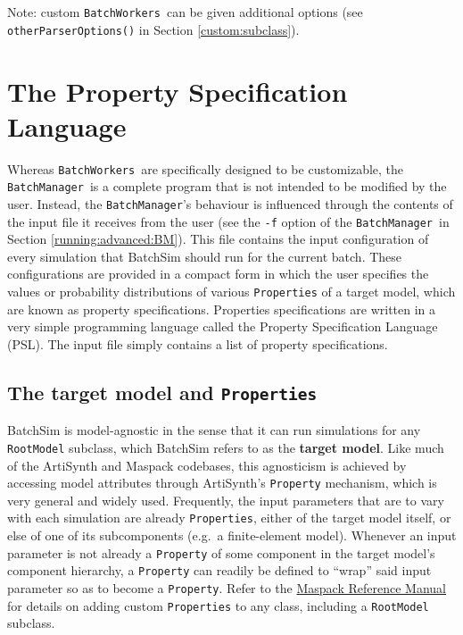 \documentclass{article}
\newcommand{\BM}{{\tt BatchManager}}
\newcommand{\BWs}{{\tt BatchWorkers}}
\begin{document}
\begin{sideblock}
Note: custom \BWs\ can be given additional options (see {\tt otherParserOptions()} in Section \ref{custom:subclass}).
\end{sideblock}

\section{The Property Specification Language}
\label{psl}

Whereas \BWs\ are specifically designed to be customizable, the \BM\ is a complete program that is not intended to be modified by the user. Instead, the \BM's behaviour is influenced through the contents of the input file it receives from the user (see the {\tt -f} option of the \BM\ in Section \ref{running:advanced:BM}). This file contains the input configuration of every simulation that BatchSim should run for the current batch. These configurations are provided in a compact form in which the user specifies the values or probability distributions of various {\tt Properties} of a target model, which are known as property specifications. Properties specifications are written in a very simple programming language called the Property Specification Language (PSL). The input file simply contains a list of property specifications.

\subsection{The target model and {\tt Properties}}
\label{psl:target-model}

BatchSim is model-agnostic in the sense that it can run simulations for any {\tt RootModel} subclass, which BatchSim refers to as the \textbf{target model}. Like much of the ArtiSynth and Maspack codebases, this agnosticism is achieved by accessing model attributes through ArtiSynth's {\tt Property} mechanism, which is very general and widely used. Frequently, the input parameters that are to vary with each simulation are already {\tt Properties}, either of the target model itself, or else of one of its subcomponents (e.g.\ a finite-element model). Whenever an input parameter is not already a {\tt Property} of some component in the target model's component hierarchy, a {\tt Property} can readily be defined to ``wrap'' said input parameter so as to become a {\tt Property}. Refer to the \href{https://www.artisynth.org/Documentation/MaspackRefManual}{Maspack Reference Manual} for details on adding custom {\tt Properties} to any class, including a {\tt RootModel} subclass.
\end{document}

